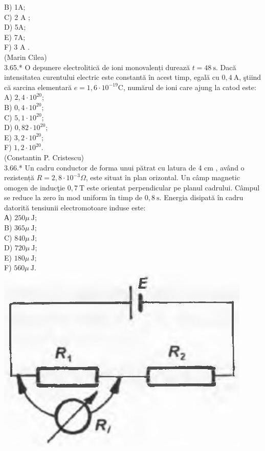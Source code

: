 \documentclass[10pt]{article}
\begin{document}
B) 1A;\\
C) 2 A ;\\
D) 5A;\\
E) 7A;\\
F) 3 A .\\
(Marin Cilea)\\
3.65.* O depunere electrolitică de ioni monovalenți durează $t=48 \mathrm{~s}$. Dacă intensitatea curentului electric este constantă în acest timp, egală cu $0,4 \mathrm{~A}$, ştiind că sarcina elementară $e=1,6 \cdot 10^{-19} \mathrm{C}$, numărul de ioni care ajung la catod este:\\
A) $2,4 \cdot 10^{20}$;\\
B) $0,4 \cdot 10^{20}$;\\
C) $5,1 \cdot 10^{20}$;\\
D) $0,82 \cdot 10^{20}$;\\
E) $3,2 \cdot 10^{20}$;\\
F) $1,2 \cdot 10^{20}$.\\
(Constantin P. Cristescu)\\
3.66.* Un cadru conductor de forma unui pătrat cu latura de 4 cm , având o rezistență $R=2,8 \cdot 10^{-3} \Omega$, este situat în plan orizontal. Un câmp magnetic omogen de inducţie $0,7 \mathrm{~T}$ este orientat perpendicular pe planul cadrului. Câmpul se reduce la zero în mod uniform în timp de $0,8 \mathrm{~s}$. Energia disipată în cadru datorită tensiunii electromotoare induse este:\\
А) $250 \mu \mathrm{~J}$;\\
B) $365 \mu \mathrm{~J}$;\\
C) $840 \mu \mathrm{~J}$;\\
D) $720 \mu \mathrm{~J}$;\\
E) $180 \mu \mathrm{~J}$;\\
F) $560 \mu \mathrm{~J}$.\\
\includegraphics[max width=\textwidth, center]{2025_07_01_5b3ff9fa0d508c8e9f17g-158}
\end{document}
